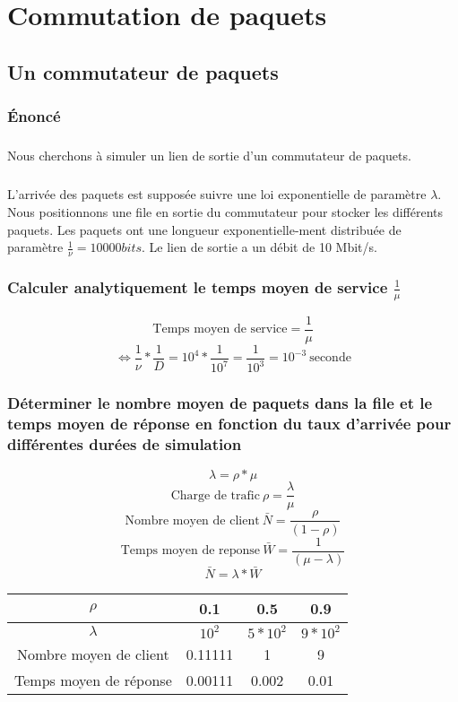%
\chapter{Commutation de paquets}
%
    \section{Un commutateur de paquets}
%
        \subsection{Énoncé}
%
            \paragraph{}
Nous cherchons à simuler un lien de sortie d'un commutateur de paquets.
%
            \paragraph{}
L'arrivée des paquets est supposée suivre une loi exponentielle de paramètre $\lambda$.
Nous positionnons une file en sortie du commutateur pour stocker les différents paquets.
Les paquets ont une longueur exponentielle-ment distribuée de paramètre $\frac{1}{\nu} = 10 000 bits$.
Le lien de sortie a un débit de 10 Mbit/s.
%
        \subsection{Calculer analytiquement le temps moyen de service $\frac{1}{\mu}$}
\[  \text{Temps moyen de service} = \frac{1}{\mu} \]
\[ \iff \frac{1}{\nu} * \frac{1}{D} = 10^{4} * \frac{1}{10^{7}} = \frac{1}{10^{3}} = 10^{-3} \ \text{seconde} \]
%
        \subsection{Déterminer le nombre moyen de paquets dans la file et le temps moyen de réponse en fonction du taux d'arrivée pour différentes durées de simulation}
\[  \lambda = \rho * \mu \]
\[  \text{Charge de trafic} \ \rho = \frac{\lambda}{\mu} \]
\[  \text{Nombre moyen de client} \ \bar{N} = \frac{\rho}{(1 - \rho)} \]
\[  \text{Temps moyen de reponse} \ \bar{W} = \frac{1}{(\mu - \lambda)} \]
\[  \bar{N} = \lambda * \bar{W} \]
\begin{tabular}{ | c | c| c | c | }
\hline
    $\rho$ & 0.1 & 0.5 & 0.9 \\
\hline
    $\lambda$ & $10^{2}$ & $5*10^{2}$ & $9*10^{2}$ \\
\hline
    Nombre moyen de client & 0.11111 & 1 & 9 \\
\hline
    Temps moyen de réponse & 0.00111 & 0.002 & 0.01 \\
\hline
\end{tabular}
%
